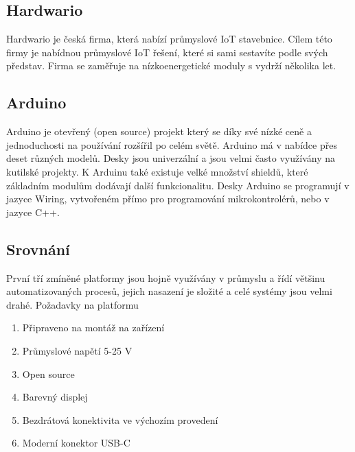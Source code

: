 \subsection{Hardwario}
Hardwario\cite{HARDWARIO} je česká firma, která nabízí průmyslové IoT stavebnice.
Cílem této firmy je nabídnou průmyslové IoT řešení, které si sami sestavíte podle svých představ.
Firma se zaměřuje na nízkoenergetické moduly s vydrží několika let.



\subsection{Arduino}
Arduino \cite{ARDUINO} je otevřený (open source) projekt který se díky své nízké ceně a jednoduchosti na používání rozšířil po celém světě.
Arduino má v nabídce přes deset různých modelů. Desky jsou univerzální a jsou velmi často využívány na kutilské projekty.
K Arduinu také existuje velké množství shieldů, které základním modulům dodávají další funkcionalitu. 
Desky Arduino se programují v jazyce Wiring, vytvořeném přímo pro programování mikrokontrolérů, nebo v jazyce C++. 




\subsection{Srovnání}

První tří zmíněné platformy jsou hojně využívány v průmyslu a řídí většinu automatizovaných procesů, jejich nasazení je složité a celé systémy jsou velmi drahé.\newline
Požadavky na platformu
\begin{enumerate}
    \item Připraveno na montáž na zařízení
    \item Průmyslové napětí 5-25 V
    \item Open source
    \item Barevný displej
    \item Bezdrátová konektivita ve výchozím provedení
		\item Moderní konektor USB-C
  \end{enumerate}


